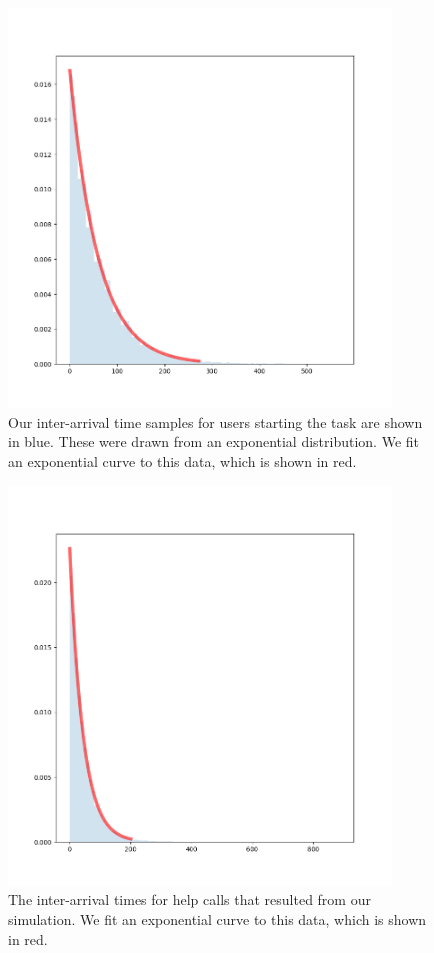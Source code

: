 \begin{figure}[h]
  \includegraphics[width=4in]{figures/montecarlo/arrival_times.png}
  \caption{
    Our inter-arrival time samples for users starting the task are shown in
    blue.
    These were drawn from an exponential distribution.
    We fit an exponential curve to this data, which is shown in red.
  }\label{fig:arrival_times}
\end{figure}

\begin{figure}[h]
  \includegraphics[width=4in]{figures/montecarlo/call_times.png}
  \caption{
    The inter-arrival times for help calls that resulted from our simulation.
    We fit an exponential curve to this data, which is shown in red.
  }\label{fig:step_patience}
\end{figure}


